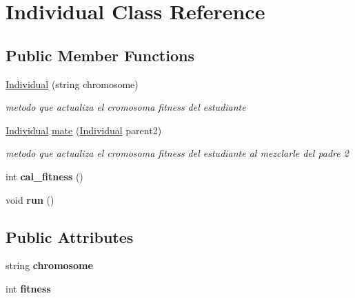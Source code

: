 \hypertarget{classIndividual}{}\section{Individual Class Reference}
\label{classIndividual}
\subsection*{Public Member Functions}
\begin{DoxyCompactItemize}
\item 
\hyperlink{classIndividual_ace9a216e77ffd4f41b061f9c6371de1a}{Individual} (string chromosome)
\begin{DoxyCompactList}\small\item\em metodo que actualiza el cromosoma fitness del estudiante \end{DoxyCompactList}\item 
\hyperlink{classIndividual}{Individual} \hyperlink{classIndividual_ad13c5f27ed332f9cb5c387936cd59654}{mate} (\hyperlink{classIndividual}{Individual} parent2)
\begin{DoxyCompactList}\small\item\em metodo que actualiza el cromosoma fitness del estudiante al mezclarle del padre 2 \end{DoxyCompactList}\item 
\mbox{\label{classIndividual_a935fbd82e667d3366accf155a35ab4e6}} 
int {\bfseries cal\+\_\+fitness} ()
\item 
\mbox{\label{classIndividual_a83003f7b05eecec2caf700ed1feee137}} 
void {\bfseries run} ()
\end{DoxyCompactItemize}
\subsection*{Public Attributes}
\begin{DoxyCompactItemize}
\item 
\mbox{\label{classIndividual_abf0a03249dc1ae06561656337e370dda}} 
string {\bfseries chromosome}
\item 
\mbox{\label{classIndividual_a6fb9208796d4c530575d3c442fb6f76b}} 
int {\bfseries fitness}
\end{DoxyCompactItemize}


